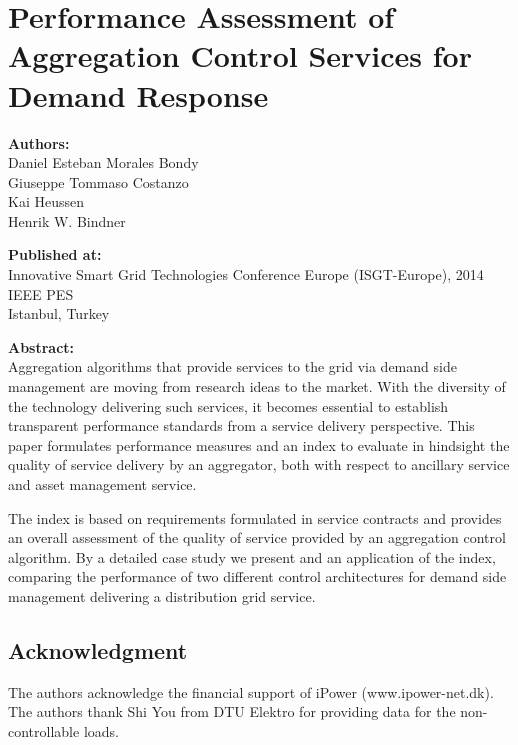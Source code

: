\chapter{Performance Assessment of Aggregation Control Services for Demand Response}\label{app:isgt2014}

\textbf{Authors:}\\
Daniel Esteban Morales Bondy\\
Giuseppe Tommaso Costanzo\\
Kai Heussen\\
Henrik W. Bindner

\noindent
\textbf{Published at:}\\
Innovative Smart Grid Technologies Conference Europe (ISGT-Europe), 2014 IEEE PES\\
Istanbul, Turkey

\noindent
\textbf{Abstract:}\\
Aggregation algorithms that provide services to the grid via demand side management are moving from research ideas to the market. With the diversity of the technology delivering such services, it becomes essential to establish transparent performance standards from a service delivery perspective. This paper formulates performance measures and an index to evaluate in hindsight the quality of service delivery by an aggregator, both with respect to ancillary service and asset management service.


The index is based on requirements formulated in service contracts and provides an overall assessment of the quality of service provided by an aggregation control algorithm. By a detailed case study we present and an application of the index, comparing the performance of two different control architectures for demand side management delivering a distribution grid service.





\section*{Acknowledgment}

The authors acknowledge the financial support of iPower (www.ipower-net.dk).
The authors thank Shi You from DTU Elektro for providing data for the non-controllable loads.


